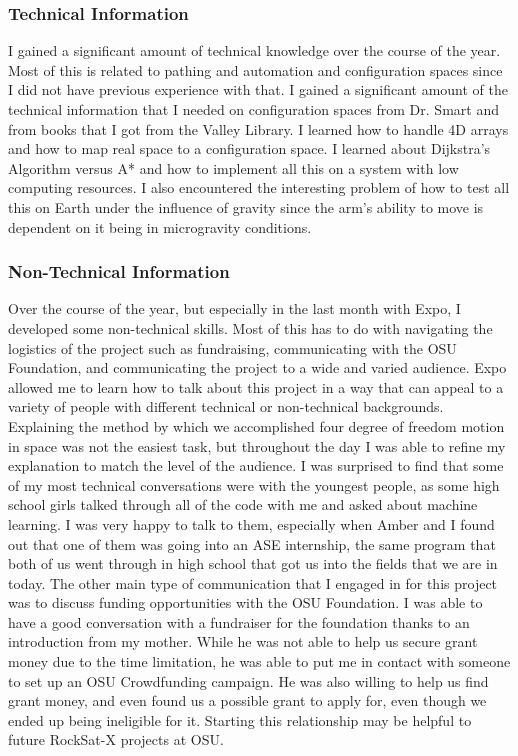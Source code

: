 \subsubsection{Technical Information}
I gained a significant amount of technical knowledge over the course of the year. Most of this 
is related to pathing and automation and configuration spaces since I did not have previous 
experience with that. I gained a significant amount of the technical information that I needed 
on configuration spaces from Dr. Smart and from books that I got from the Valley Library. I 
learned how to handle 4D arrays and how to map real space to a configuration space. I learned 
about Dijkstra's Algorithm versus A* and how to implement all this on a system with low computing
 resources. I also encountered the interesting problem of how to test all this on Earth under the
 influence of gravity since the arm's ability to move is dependent on it being in microgravity 
conditions.

\subsubsection{Non-Technical Information}
Over the course of the year, but especially in the last month with Expo, I developed some 
non-technical skills. Most of this has to do with navigating the logistics of the project such as
 fundraising, communicating with the OSU Foundation, and communicating the project to a wide and 
varied audience. Expo allowed me to learn how to talk about this project in a way that can appeal
 to a variety of people with different technical or non-technical backgrounds. Explaining the 
method by which we accomplished four degree of freedom motion in space was not the easiest task, 
but throughout the day I was able to refine my explanation to match the level of the audience. I 
was surprised to find that some of my most technical conversations were with the youngest people,
 as some high school girls talked through all of the code with me and asked about machine 
learning. I was very happy to talk to them, especially when Amber and I found out that one of 
them was going into an ASE internship, the same program that both of us went through in high 
school that got us into the fields that we are in today. The other main type of communication 
that I engaged in for this project was to discuss funding opportunities with the OSU Foundation. 
I was able to have a good conversation with a fundraiser for the foundation thanks to an 
introduction from my mother. While he was not able to help us secure grant money due to the time 
limitation, he was able to put me in contact with someone to set up an OSU Crowdfunding campaign. He was also willing to help us find grant money, and even found us a possible grant to apply 
for, even though we ended up being ineligible for it. Starting this relationship may be helpful 
to future RockSat-X projects at OSU.

